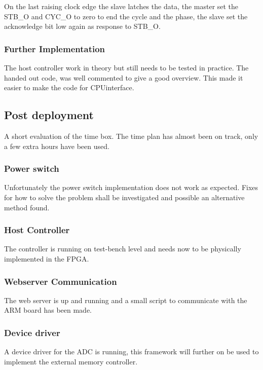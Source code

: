 On the last raising clock edge the slave latches the data, the master set the STB\_O and CYC\_O to zero to end the cycle and the phase, the slave set the acknowledge bit low again as response to STB\_O.
\subsubsection{Further Implementation}
The host controller work in theory but still needs to be tested in practice. The handed out code, was well commented to give a good overview. This made it easier to make the code for CPUinterface.

\subsection{Post deployment}
A short evaluation of the time box. The time plan has almost been on track, only a few extra hours have been used. 
\subsubsection{Power switch}
Unfortunately the power switch implementation does not work as expected. Fixes for how to solve the problem shall be investigated and possible an alternative method found. 
\subsubsection{Host Controller}
The controller is running on test-bench level and needs now to be physically implemented in the FPGA. 
\subsubsection{Webserver Communication}
The web server is up and running and a small script to communicate with the ARM board has been made. 
\subsubsection{Device driver}
A device driver for the ADC is running, this framework will further on be used to implement the external memory controller. 

